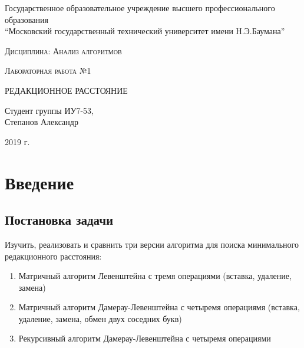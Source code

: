 ﻿\documentclass[a4paper,12pt]{article}
\begin{document}
    \begin{titlepage}

        \begin{center}
            \large
            Государственное образовательное учреждение высшего профессионального образования\\
            “Московский государственный технический университет имени Н.Э.Баумана”
            \vspace{3cm}
            
            \textsc{Дисциплина: Анализ алгоритмов}
            \vspace{0.5cm}
                
            \textsc{Лабораторная работа №1}
            \vspace{3cm}
            
            {\LARGE РЕДАКЦИОННОЕ РАССТОЯНИЕ}
            \vspace{3cm}
            
            Студент группы ИУ7-53,\\   
            Степанов Александр
            \vfill
            
            2019 г.
            
        \end{center}

    \end{titlepage}

    \tableofcontents
    \newpage

    \section{Введение}
    \subsection{Постановка задачи}

    Изучить, реализовать и сравнить три версии алгоритма для поиска минимального редакционного расстояния:

    \begin{enumerate}
        \item Матричный алгоритм Левенштейна с тремя операциями (вставка, удаление, замена)
        \item Матричный алгоритм Дамерау-Левенштейна с четыремя операциямя (вставка, удаление, замена, обмен двух соседних букв)
        \item Рекурсивный алгоритм Дамерау-Левенштейна с четыремя операциями
    \end{enumerate}
\end{document}
